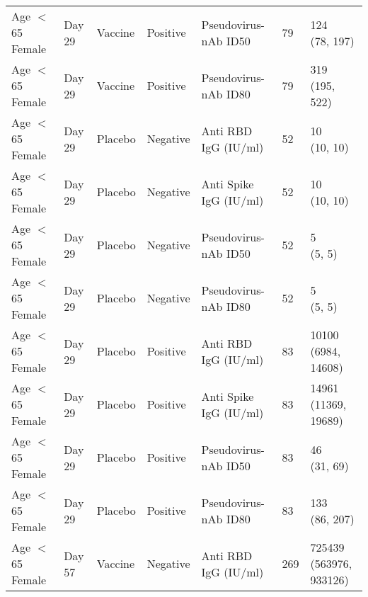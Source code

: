 \documentclass[]{book}
\theoremstyle{definition}
\theoremstyle{definition}
\theoremstyle{definition}
\newcommand{\1}{\mathbbm{1}}
\begin{document}
\begin{landscape}
\begin{ThreePartTable}
\begin{longtable}[t]{>{\raggedright\arraybackslash}p{7cm}llllll}
\hspace{1em}Age $<$ 65 Female & Day 29 & Vaccine & Positive & Pseudovirus-nAb ID50 & 79 & \makecell[l]{124\\(78, 197)}\\
\hspace{1em}Age $<$ 65 Female & Day 29 & Vaccine & Positive & Pseudovirus-nAb ID80 & 79 & \makecell[l]{319\\(195, 522)}\\
\hspace{1em}Age $<$ 65 Female & Day 29 & Placebo & Negative & Anti RBD IgG (IU/ml) & 52 & \makecell[l]{10\\(10, 10)}\\
\hspace{1em}Age $<$ 65 Female & Day 29 & Placebo & Negative & Anti Spike IgG (IU/ml) & 52 & \makecell[l]{10\\(10, 10)}\\
\hspace{1em}Age $<$ 65 Female & Day 29 & Placebo & Negative & Pseudovirus-nAb ID50 & 52 & \makecell[l]{5\\(5, 5)}\\
\hspace{1em}Age $<$ 65 Female & Day 29 & Placebo & Negative & Pseudovirus-nAb ID80 & 52 & \makecell[l]{5\\(5, 5)}\\
\hspace{1em}Age $<$ 65 Female & Day 29 & Placebo & Positive & Anti RBD IgG (IU/ml) & 83 & \makecell[l]{10100\\(6984, 14608)}\\
\hspace{1em}Age $<$ 65 Female & Day 29 & Placebo & Positive & Anti Spike IgG (IU/ml) & 83 & \makecell[l]{14961\\(11369, 19689)}\\
\hspace{1em}Age $<$ 65 Female & Day 29 & Placebo & Positive & Pseudovirus-nAb ID50 & 83 & \makecell[l]{46\\(31, 69)}\\
\hspace{1em}Age $<$ 65 Female & Day 29 & Placebo & Positive & Pseudovirus-nAb ID80 & 83 & \makecell[l]{133\\(86, 207)}\\
\hspace{1em}Age $<$ 65 Female & Day 57 & Vaccine & Negative & Anti RBD IgG (IU/ml) & 269 & \makecell[l]{725439\\(563976, 933126)}\\

\end{longtable}
\end{ThreePartTable}
\end{landscape}
\end{document}
